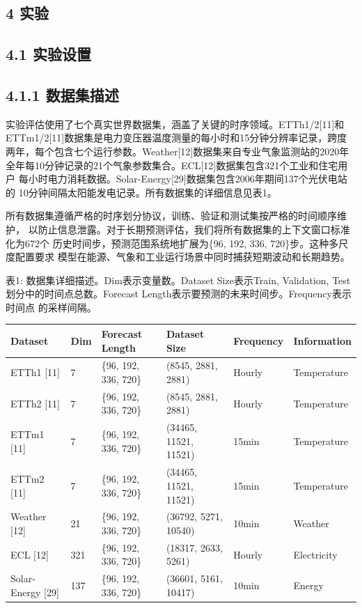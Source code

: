 \documentclass[
  10
]{article}
\newcounter{none} %
\begin{document}
\subsection{4 实验}\label{experiments}

\subsection{4.1 实验设置}\label{experimental-settings}

\subsection{4.1.1 数据集描述}\label{dataset-descriptions}

实验评估使用了七个真实世界数据集，涵盖了关键的时序领域。ETTh1/2{[}11{]}和
ETTm1/2{[}11{]}数据集是电力变压器温度测量的每小时和15分钟分辨率记录，跨度
两年，每个包含七个运行参数。Weather{[}12{]}数据集来自专业气象监测站的2020年
全年每10分钟记录的21个气象参数集合。ECL{[}12{]}数据集包含321个工业和住宅用户
每小时电力消耗数据。Solar-Energy{[}29{]}数据集包含2006年期间137个光伏电站的
10分钟间隔太阳能发电记录。所有数据集的详细信息见表1。

所有数据集遵循严格的时序划分协议，训练、验证和测试集按严格的时间顺序维护，
以防止信息泄露。对于长期预测评估，我们将所有数据集的上下文窗口标准化为672个
历史时间步，预测范围系统地扩展为\{96, 192, 336, 720\}步。这种多尺度配置要求
模型在能源、气象和工业运行场景中同时捕获短期波动和长期趋势。

表1: 数据集详细描述。Dim表示变量数。Dataset Size表示{Train, Validation, Test}
划分中的时间点总数。Forecast Length表示要预测的未来时间步。Frequency表示时间点
的采样间隔。

{\def\LTcaptype{none} %
\begin{longtable}[]{@{}|l|l|l|l|l|l|@{}}
\toprule\noalign{}
\endhead
\bottomrule\noalign{}
\endlastfoot
\hline
Dataset & Dim & Forecast Length & Dataset Size & Frequency &
Information \\
\hline
ETTh1 {[}11{]} & 7 & \{96, 192, 336, 720\} & (8545, 2881, 2881) & Hourly
& Temperature \\
\hline
ETTh2 {[}11{]} & 7 & \{96, 192, 336, 720\} & (8545, 2881, 2881) & Hourly
& Temperature \\
\hline
ETTm1 {[}11{]} & 7 & \{96, 192, 336, 720\} & (34465, 11521, 11521) &
15min & Temperature \\
\hline
ETTm2 {[}11{]} & 7 & \{96, 192, 336, 720\} & (34465, 11521, 11521) &
15min & Temperature \\
\hline
Weather {[}12{]} & 21 & \{96, 192, 336, 720\} & (36792, 5271, 10540) &
10min & Weather \\
\hline
ECL {[}12{]} & 321 & \{96, 192, 336, 720\} & (18317, 2633, 5261) &
Hourly & Electricity \\
\hline
Solar-Energy {[}29{]} & 137 & \{96, 192, 336, 720\} & (36601, 5161,
10417) & 10min & Energy \\
\hline
\end{longtable}
}
\end{document}
